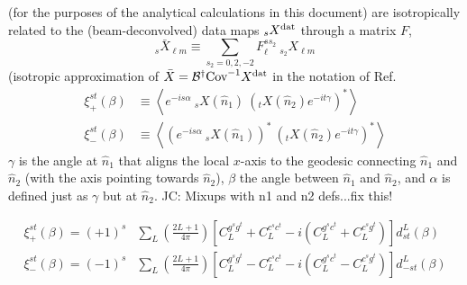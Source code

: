\documentclass[reprint,prd, superscriptaddress, tightenlines, longbibliography, nofootinbib, eqsecnum, amsfonts, amsmath, floatfix, notitlepage, twocolumn]{revtex4-1}
\newcommand{\Cov}[0]{{\textrm{Cov}}}
\newcommand{\av}[1]{\left\langle #1 \right\rangle}
\newcommand{\JC}[1]{\color{red}JC: #1\color{black}}
\newcommand{\hn}[0]{\hat n}
\begin{document}
(for the purposes of the analytical calculations in this document) are isotropically related to the (beam-deconvolved) data maps $_sX^{\rm dat}$ through a matrix $F$,
\begin{equation}\label{eq:filter}
	_{s}\bar X_{\ell m} \equiv \sum_{s_2 = 0,2,-2}F_\ell^{s s_2} \:_{s_2}X_{\ell m}
\end{equation} 
(isotropic approximation of $\bar X = \mathcal B^\dagger \Cov^{-1} X ^\textrm{\rm dat}$ in the notation of Ref.~\cite{Aghanim:2018oex}
\begin{equation}\label{eq:cf}
\begin{split}
	\xi^{st}_{+}(\beta) &\equiv \av{e^{-is \alpha}\:_{s}X(\hn_1)\:\left(_{t}X(\hn_2)e^{-i t\gamma}\right)^*}\\
		\xi^{st}_{-}(\beta)& \equiv \av{ \left(e^{-is \alpha}\:_{s}X(\hn_1)\right)^*\:\left(_{t}X(\hn_2)e^{-i t\gamma}\right)^*}
\end{split}
\end{equation}
$\gamma$ is the angle at $\hn_1$ that aligns the local $x$-axis to the geodesic connecting $\hn_1$ and $\hn_2$ (with the axis pointing towards $\hn_2$), $\beta$ the angle between $\hn_1$ and $\hn_2$, and $\alpha$ is defined just as $\gamma$ but at $\hn_2$.\cite{Chon:2003gx, Challinor:2005jy}
\JC{Mixups with n1 and n2 defs...fix this!}
\begin{widetext}
\begin{equation}
\begin{split}
	\xi_{+}^{st}(\beta) =\left(+1\right)^s &\sum_{L} \left(\frac{2L + 1}{4\pi}\right) \left[C_L^{g^sg^{t}} + C_L^{c^sc^{t} }-i\left(C_L^{g^sc^{t}} + C_L^{c^sg^{t}}\right)\right]d^L_{s t}(\beta) \\
	\xi_{-}^{st}(\beta) = \left(-1\right)^s &\sum_{L} \left(\frac{2L + 1}{4\pi}\right) \left[C_L^{g^sg^{t}} - C_L^{c^sc^{t} }-i\left(C_L^{g^sc^{t}} - C_L^{c^sg^{t}}\right)\right]d^L_{-s t}(\beta) 
\end{split}
\end{equation}
\end{widetext}
\end{document}
